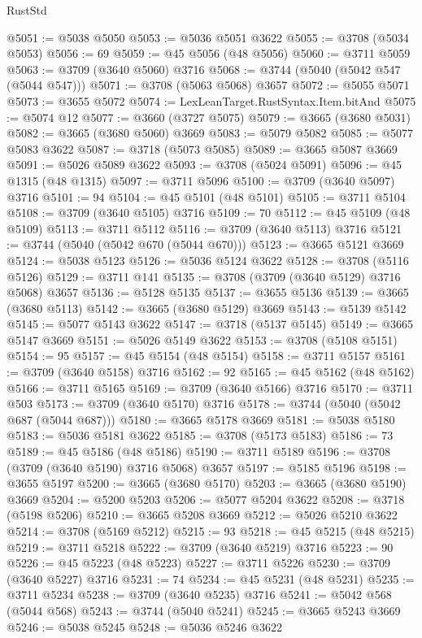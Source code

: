 \begin{lexlean}{RustStd}
\begin{coremodule}
@5051 := @5038 @5050
@5053 := @5036 @5051 @3622
@5055 := @3708 (@5034 @5053)
@5056 := 69
@5059 := @45 @5056 (@48 @5056)
@5060 := @3711 @5059
@5063 := @3709 (@3640 @5060) @3716
@5068 := @3744 (@5040 (@5042 @547 (@5044 @547)))
@5071 := @3708 (@5063 @5068) @3657
@5072 := @5055 @5071
@5073 := @3655 @5072
@5074 := LexLeanTarget.RustSyntax.Item.bitAnd
@5075 := @5074 @12
@5077 := @3660 (@3727 @5075)
@5079 := @3665 (@3680 @5031)
@5082 := @3665 (@3680 @5060) @3669
@5083 := @5079 @5082
@5085 := @5077 @5083 @3622
@5087 := @3718 (@5073 @5085)
@5089 := @3665 @5087 @3669
@5091 := @5026 @5089 @3622
@5093 := @3708 (@5024 @5091)
@5096 := @45 @1315 (@48 @1315)
@5097 := @3711 @5096
@5100 := @3709 (@3640 @5097) @3716
@5101 := 94
@5104 := @45 @5101 (@48 @5101)
@5105 := @3711 @5104
@5108 := @3709 (@3640 @5105) @3716
@5109 := 70
@5112 := @45 @5109 (@48 @5109)
@5113 := @3711 @5112
@5116 := @3709 (@3640 @5113) @3716
@5121 := @3744 (@5040 (@5042 @670 (@5044 @670)))
@5123 := @3665 @5121 @3669
@5124 := @5038 @5123
@5126 := @5036 @5124 @3622
@5128 := @3708 (@5116 @5126)
@5129 := @3711 @141
@5135 := @3708 (@3709 (@3640 @5129) @3716 @5068) @3657
@5136 := @5128 @5135
@5137 := @3655 @5136
@5139 := @3665 (@3680 @5113)
@5142 := @3665 (@3680 @5129) @3669
@5143 := @5139 @5142
@5145 := @5077 @5143 @3622
@5147 := @3718 (@5137 @5145)
@5149 := @3665 @5147 @3669
@5151 := @5026 @5149 @3622
@5153 := @3708 (@5108 @5151)
@5154 := 95
@5157 := @45 @5154 (@48 @5154)
@5158 := @3711 @5157
@5161 := @3709 (@3640 @5158) @3716
@5162 := 92
@5165 := @45 @5162 (@48 @5162)
@5166 := @3711 @5165
@5169 := @3709 (@3640 @5166) @3716
@5170 := @3711 @503
@5173 := @3709 (@3640 @5170) @3716
@5178 := @3744 (@5040 (@5042 @687 (@5044 @687)))
@5180 := @3665 @5178 @3669
@5181 := @5038 @5180
@5183 := @5036 @5181 @3622
@5185 := @3708 (@5173 @5183)
@5186 := 73
@5189 := @45 @5186 (@48 @5186)
@5190 := @3711 @5189
@5196 := @3708 (@3709 (@3640 @5190) @3716 @5068) @3657
@5197 := @5185 @5196
@5198 := @3655 @5197
@5200 := @3665 (@3680 @5170)
@5203 := @3665 (@3680 @5190) @3669
@5204 := @5200 @5203
@5206 := @5077 @5204 @3622
@5208 := @3718 (@5198 @5206)
@5210 := @3665 @5208 @3669
@5212 := @5026 @5210 @3622
@5214 := @3708 (@5169 @5212)
@5215 := 93
@5218 := @45 @5215 (@48 @5215)
@5219 := @3711 @5218
@5222 := @3709 (@3640 @5219) @3716
@5223 := 90
@5226 := @45 @5223 (@48 @5223)
@5227 := @3711 @5226
@5230 := @3709 (@3640 @5227) @3716
@5231 := 74
@5234 := @45 @5231 (@48 @5231)
@5235 := @3711 @5234
@5238 := @3709 (@3640 @5235) @3716
@5241 := @5042 @568 (@5044 @568)
@5243 := @3744 (@5040 @5241)
@5245 := @3665 @5243 @3669
@5246 := @5038 @5245
@5248 := @5036 @5246 @3622

\end{coremodule}
\end{lexlean}
